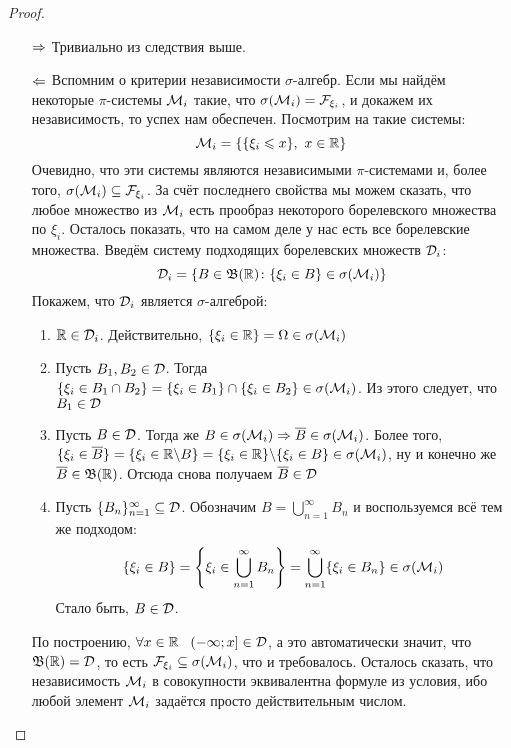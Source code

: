 \begin{proof}~
	\begin{itemize}
		\item[$\Rightarrow$] Тривиально из следствия выше.
		
		\item[$\Leftarrow$] Вспомним о критерии независимости $\sigma$-алгебр. Если мы найдём некоторые $\pi$-системы $\mathcal{M}_i$ такие, что $\sigma(\mathcal{M}_i) = \mathcal{F}_{\xi_i}$, и докажем их независимость, то успех нам обеспечен. Посмотрим на такие системы:
		\[
			\mathcal{M}_i = \{\{\xi_i \leqslant x\},\ x \in \mathbb{R}\}
		\]
		Очевидно, что эти системы являются независимыми $\pi$-системами и, более того, $\sigma(\mathcal{M}_i) \subseteq \mathcal{F}_{\xi_i}$. За счёт последнего свойства мы можем сказать, что любое множество из $\mathcal{M}_i$ есть прообраз некоторого борелевского множества по $\xi_i$. Осталось показать, что на самом деле у нас есть все борелевские множества. Введём систему подходящих борелевских множеств $\mathcal{D}_i$:
		\[
			\mathcal{D}_i = \{B \in \mathfrak{B}(\mathbb{R}) \colon \{\xi_i \in B\} \in \sigma(\mathcal{M}_i)\}
		\]
		Покажем, что $\mathcal{D}_i$ является $\sigma$-алгеброй:
		\begin{enumerate}
			\item $\mathbb{R} \in \mathcal{D}_i$. Действительно, $\{\xi_i \in \mathbb{R}\} = \Omega \in \sigma(\mathcal{M}_i)$
			
			\item Пусть $B_1, B_2 \in \mathcal{D}$. Тогда $\{\xi_i \in B_1 \cap B_2\} = \{\xi_i \in B_1\} \cap \{\xi_i \in B_2\} \in \sigma(\mathcal{M}_i)$. Из этого следует, что $B_1 \in \mathcal{D}$
			
			\item Пусть $B \in \mathcal{D}$. Тогда же $B \in \sigma(\mathcal{M}_i) \Rightarrow \overline{B} \in \sigma(\mathcal{M}_i)$. Более того, $\{\xi_i \in \overline{B}\} = \{\xi_i \in \mathbb{R} \backslash B\} = \{\xi_i \in \mathbb{R}\} \backslash \{\xi_i \in B\} \in \sigma(\mathcal{M}_i)$, ну и конечно же $\overline{B} \in \mathfrak{B}(\mathbb{R})$. Отсюда снова получаем $\overline{B} \in \mathcal{D}$
			
			\item Пусть $\{B_n\}_{n = 1}^\infty \subseteq \mathcal{D}$. Обозначим $B = \bigcup_{n = 1}^\infty B_n$ и воспользуемся всё тем же подходом:
			\[
				\{\xi_i \in B\} = \left\{\xi_i \in \bigcup_{n = 1}^\infty B_n\right\} = \bigcup_{n = 1}^\infty \{\xi_i \in B_n\} \in \sigma(\mathcal{M}_i)
			\]
			Стало быть, $B \in \mathcal{D}$.
		\end{enumerate}
		По построению, $\forall x \in \R\ \ \rsi{-\infty; x} \in \cD$, а это автоматически значит, что $\mathfrak{B}(\mathbb{R}) = \mathcal{D}$, то есть $\mathcal{F}_{\xi_i} \subseteq \sigma(\mathcal{M}_i)$, что и требовалось. Осталось сказать, что независимость $\mathcal{M}_i$ в совокупности эквивалентна формуле из условия, ибо любой элемент $\mathcal{M}_i$ задаётся просто действительным числом.
	\end{itemize}
\end{proof}